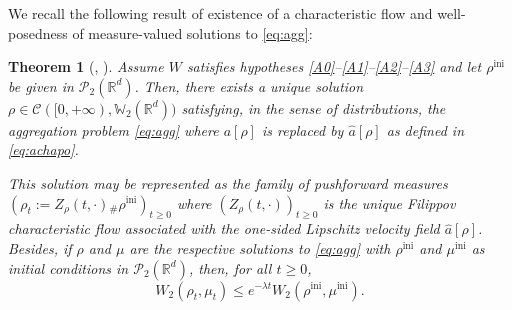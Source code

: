 \documentclass[JEP,XML,SOM,Unicode, NoFloatCountersInSection,published]{cedram}
\newcommand{\ini}{\mathrm{ini}}
\def\RR{\mathbb{R}}
\def\WW{\mathbb{W}}
\def\calC{{\mathcal C}}
\def\calP{{\mathcal P}}
\def\achapo{\widehat{a}}
\theoremstyle{plain}
\newtheorem{theorem}{Theorem}[section]
\theoremstyle{definition}
\begin{document}
We recall the following result of existence of a characteristic flow and well-posedness of measure-valued solutions to \eqref{eq:agg}:
\begin{theorem}[{\cite[Th.\,2.12 \& 2.13]{figalli11}, \cite[Th.\,2.5 \& 2.9]{cjlv15}}]\label{thm:cjlv15}
Assume $W$ satisfies hypotheses \eqref{A0}--\eqref{A1}--\eqref{A2}--\eqref{A3} and let $\rho^{\ini}$ be given in $\calP_2(\RR^d)$.
Then, there exists a unique solution $\rho \in \calC([0,+\infty), \WW _2(\RR^d))$
satisfying, in the sense of distributions, the aggregation problem \eqref{eq:agg} where $a[\rho]$ is replaced by $\achapo[\rho]$ as defined in \eqref{eq:achapo}.

This solution may be represented as the family of pushforward measures
$(\rho_t:=Z_{\rho}(t,\cdot){}_\# \rho^{\ini})_{t \geq 0}$
where $(Z_{\rho}(t,\cdot))_{t \geq 0}$ is the unique Filippov characteristic flow associated with the one-sided Lipschitz velocity
field $\achapo[\rho]$.
Besides, if $\rho$ and $\mu$
are the respective solutions to \eqref{eq:agg}
with $\rho^{\ini}$ and $\mu^{\ini}$ as initial conditions in ${\mathcal P}_{2}(\RR^d)$,
then, for all $t \geq 0$,
\begin{equation}\label{ineq:contractionLambdaCvx:cjlv5}
W_2(\rho_t,\mu_t) \leq e^{- \lambda t}
W_2(\rho^{\ini},\mu^{\ini}).
\end{equation}
\end{theorem}
\end{document}
